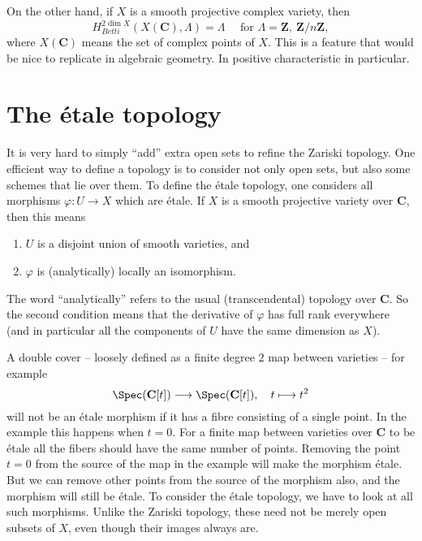 \medskip\noindent
On the other hand, if $X$ is a smooth projective complex variety, then
$$
H_{Betti}^{2 \dim X}(X (\mathbf{C}), \Lambda) = \Lambda \quad \text{ for }
\Lambda = \mathbf{Z}, \ \mathbf{Z}/n\mathbf{Z},
$$
where $X(\mathbf{C})$ means the set of complex points of $X$. This is a feature
that would be nice to replicate in algebraic geometry. In positive
characteristic in particular.




\section{The \'etale topology}
\label{section-etale-topology}

\noindent
It is very hard to simply ``add'' extra open sets to refine the Zariski
topology. One efficient way to define a topology is to consider not only open
sets, but also some schemes that lie over them. To define the \'etale topology,
one considers all morphisms $\varphi : U \to X$ which are \'etale. If
$X$ is a smooth projective variety over $\mathbf{C}$, then this means
\begin{enumerate}
\item $U$ is a disjoint union of smooth varieties, and
\item $\varphi$ is (analytically) locally an isomorphism.
\end{enumerate}
The word ``analytically'' refers to the usual (transcendental) topology over
$\mathbf{C}$. So the second condition means that the derivative of $\varphi$
has full rank everywhere (and in particular all the components of $U$
have the same dimension as $X$).

\medskip\noindent
A double cover -- loosely defined as a finite degree $2$ map between varieties
-- for example
$$
\Spec(\mathbf{C}[t])
\longrightarrow
\Spec(\mathbf{C}[t]),
\quad t \longmapsto t^2
$$
will not be an \'etale morphism if it has a fibre consisting of a single point.
In the example this happens when $t = 0$. For a finite map between varieties
over $\mathbf{C}$ to be \'etale all the fibers should have the same number of
points. Removing the point $t = 0$ from the source of the map in the example
will make the morphism \'etale. But we can remove other points from the source
of the morphism also, and the morphism will still be \'etale.  To consider the
\'etale topology, we have to look at all such morphisms. Unlike the Zariski
topology, these need not be merely open subsets of $X$, even though their
images always are.

